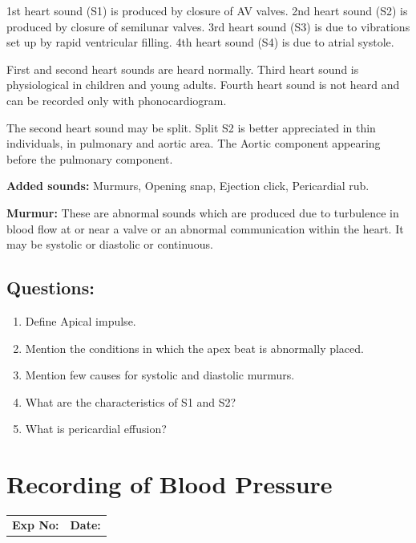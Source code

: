 \documentclass[a4paper,12pt]{book}
\begin{document}
\par
1st heart sound (S1) is produced by closure of AV valves.\newline
2nd heart sound (S2) is produced by closure of semilunar valves.\newline
3rd heart sound (S3) is due to vibrations set up by rapid ventricular filling.\newline
4th heart sound (S4) is due to atrial systole.\newline
\par
First and second heart sounds are heard normally. Third heart sound is physiological in children and young adults. Fourth heart sound is not heard and can be recorded only with phonocardiogram.
\par
The second heart sound may be split. Split S2 is better appreciated in thin individuals, in pulmonary and aortic area. The Aortic component appearing before the pulmonary component.
\par
\textbf{Added sounds:} Murmurs, Opening snap, Ejection click, Pericardial rub.
\par
\textbf{Murmur:} These are abnormal sounds which are produced due to turbulence in blood flow at or near a valve or an abnormal communication within the heart. It may be systolic or diastolic or continuous.
	      \section*{Questions:}
	      \begin{enumerate}
\item{Define Apical impulse.}
\item{Mention the conditions in which the apex beat is abnormally placed.}
\item{Mention few causes for systolic and diastolic murmurs.}
\item{What are the characteristics of S1 and S2?}
\item{What is pericardial effusion?}
	      \end{enumerate}
															\chapter*{\centering Recording of Blood Pressure}
															\begin{tabular}{p{5in} p{1in}}
																\textbf{Exp No:}  & \textbf{Date:}\\
															\end{tabular}
\end{document}
